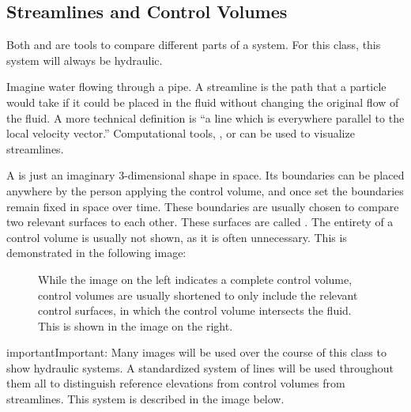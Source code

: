 \documentclass[letterpaper,10pt,english]{sphinxmanual}
\let\sphinxpxdimen\pdfpxdimen\else\newdimen\sphinxpxdimen
\begin{document}
\subsection{Streamlines and Control Volumes}
\label{\detokenize{Review/Review_Fluid_Mechanics:streamlines-and-control-volumes}}\label{\detokenize{Review/Review_Fluid_Mechanics:heading-streamlines-and-control-volumes}}
Both  and  are tools to compare different parts of a system. For this class, this system will always be hydraulic.

Imagine water flowing through a pipe. A streamline is the path that a particle would take if it could be placed in the fluid without changing the original flow of the fluid. A more technical definition is “a line which is everywhere parallel to the local velocity vector.” Computational tools, , or  can be used to visualize streamlines.

A  is just an imaginary 3-dimensional shape in space. Its boundaries can be placed anywhere by the person applying the control volume, and once set the boundaries remain fixed in space over time. These boundaries are usually chosen to compare two relevant surfaces to each other. These surfaces are called . The entirety of a control volume is usually not shown, as it is often unnecessary. This is demonstrated in the following image:

\begin{figure}[htbp]
\centering
\capstart

\noindent\sphinxincludegraphics[width=650\sphinxpxdimen]{{control_volume_simplification}.png}
\caption{While the image on the left indicates a complete control volume, control volumes are usually shortened to only include the relevant control surfaces, in which the control volume intersects the fluid. This is shown in the image on the right.}\label{\detokenize{Review/Review_Fluid_Mechanics:id3}}\label{\detokenize{Review/Review_Fluid_Mechanics:figure-control-volume-simplification}}\end{figure}

\begin{sphinxadmonition}{important}{Important:}
Many images will be used over the course of this class to show hydraulic systems. A standardized system of lines will be used throughout them all to distinguish reference elevations from control volumes from streamlines. This system is described in the image below.
\end{sphinxadmonition}
\end{document}
